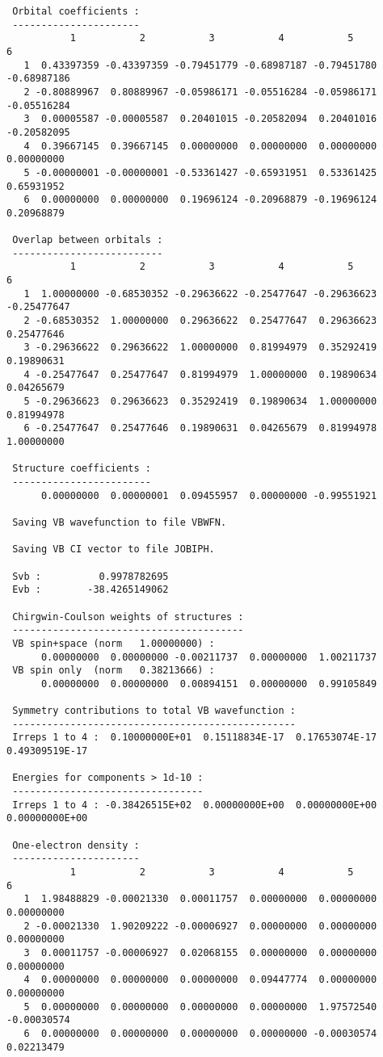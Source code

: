 {\begin{footnotesize}
\begin{verbatim}
 Orbital coefficients :
 ----------------------
           1           2           3           4           5           6
   1  0.43397359 -0.43397359 -0.79451779 -0.68987187 -0.79451780 -0.68987186
   2 -0.80889967  0.80889967 -0.05986171 -0.05516284 -0.05986171 -0.05516284
   3  0.00005587 -0.00005587  0.20401015 -0.20582094  0.20401016 -0.20582095
   4  0.39667145  0.39667145  0.00000000  0.00000000  0.00000000  0.00000000
   5 -0.00000001 -0.00000001 -0.53361427 -0.65931951  0.53361425  0.65931952
   6  0.00000000  0.00000000  0.19696124 -0.20968879 -0.19696124  0.20968879

 Overlap between orbitals :
 --------------------------
           1           2           3           4           5           6
   1  1.00000000 -0.68530352 -0.29636622 -0.25477647 -0.29636623 -0.25477647
   2 -0.68530352  1.00000000  0.29636622  0.25477647  0.29636623  0.25477646
   3 -0.29636622  0.29636622  1.00000000  0.81994979  0.35292419  0.19890631
   4 -0.25477647  0.25477647  0.81994979  1.00000000  0.19890634  0.04265679
   5 -0.29636623  0.29636623  0.35292419  0.19890634  1.00000000  0.81994978
   6 -0.25477647  0.25477646  0.19890631  0.04265679  0.81994978  1.00000000

 Structure coefficients :
 ------------------------
      0.00000000  0.00000001  0.09455957  0.00000000 -0.99551921
 
 Saving VB wavefunction to file VBWFN.
 
 Saving VB CI vector to file JOBIPH.
 
 Svb :          0.9978782695
 Evb :        -38.4265149062

 Chirgwin-Coulson weights of structures :
 ----------------------------------------
 VB spin+space (norm   1.00000000) :
      0.00000000  0.00000000 -0.00211737  0.00000000  1.00211737
 VB spin only  (norm   0.38213666) :
      0.00000000  0.00000000  0.00894151  0.00000000  0.99105849

 Symmetry contributions to total VB wavefunction :
 -------------------------------------------------
 Irreps 1 to 4 :  0.10000000E+01  0.15118834E-17  0.17653074E-17  0.49309519E-17

 Energies for components > 1d-10 :
 ---------------------------------
 Irreps 1 to 4 : -0.38426515E+02  0.00000000E+00  0.00000000E+00  0.00000000E+00

 One-electron density :
 ----------------------
           1           2           3           4           5           6
   1  1.98488829 -0.00021330  0.00011757  0.00000000  0.00000000  0.00000000
   2 -0.00021330  1.90209222 -0.00006927  0.00000000  0.00000000  0.00000000
   3  0.00011757 -0.00006927  0.02068155  0.00000000  0.00000000  0.00000000
   4  0.00000000  0.00000000  0.00000000  0.09447774  0.00000000  0.00000000
   5  0.00000000  0.00000000  0.00000000  0.00000000  1.97572540 -0.00030574
   6  0.00000000  0.00000000  0.00000000  0.00000000 -0.00030574  0.02213479


\end{verbatim}
\end{footnotesize}}
